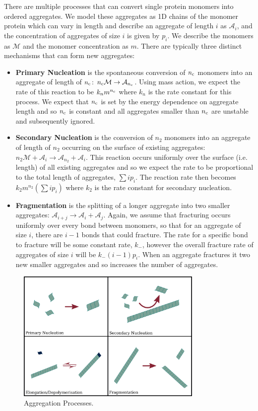 There are multiple processes that can convert single protein monomers into ordered aggregates. We model these aggregates as 1D chains of the monomer protein which can vary in length and describe an aggregate of length $i$ as $\mathcal{A}_i$, and the concentration of aggregates of size $i$ is given by $p_i$. We describe the monomers as $\mathcal{M}$ and the monomer concentration as $m$. There are typically three distinct mechanisms that can form new aggregates:
\begin{itemize}
    \item \textbf{Primary Nucleation} is the spontaneous conversion of $n_{\mathrm{c}}$ monomers into an aggregate of length of $n_{\mathrm{c}}$: $n_{\mathrm{c}}\mathcal{M} \rightarrow \mathcal{A}_{n_{\mathrm{c}}}$. Using mass action, we expect the rate of this reaction to be $k_n m^{n_{\mathrm{c}}}$ where $k_n$ is the rate constant for this process. We expect that $n_{\mathrm{c}}$ is set by the energy dependence on aggregate length and so $n_{\mathrm{c}}$ is constant and all aggregates smaller than $n_{\mathrm{c}}$ are unstable and subsequently ignored.
    \item \textbf{Secondary Nucleation} is the conversion of $n_2$ monomers into an aggregate of length of $n_2$ occurring on the surface of existing aggregates: $n_2 \mathcal{M} + \mathcal{A}_{i} \rightarrow \mathcal{A}_{n_2} + \mathcal{A}_{i}$. This reaction occurs uniformly over the surface (i.e. length) of all existing aggregates and so we expect the rate to be proportional to the total length of aggregates, $\sum i p_i$. The reaction rate then becomes $k_2 m^{n_2}(\sum i p_i)$ where $k_2$ is the rate constant for secondary nucleation.
    \item \textbf{Fragmentation} is the splitting of a longer aggregate into two smaller aggregates: $\mathcal{A}_{i+j} \rightarrow \mathcal{A}_{i} + \mathcal{A}_{j}$. Again, we assume that fracturing occurs uniformly over every bond between monomers, so that for an aggregate of size $i$, there are $i-1$ bonds that could fracture. The rate for a specific bond to fracture will be some constant rate, $k_{-}$, however the overall fracture rate of aggregates of size $i$ will be $k_{-}(i-1)p_i$. When an aggregate fractures it two new smaller aggregates and so increases the number of aggregates.
\end{itemize}

\begin{figure}
    \centering
    \includegraphics[width=0.8\textwidth]{figures/aggProcesses.pdf}
    \caption{Aggregation Processes.}
    \label{fig:phase_sep_scheme}
\end{figure}

